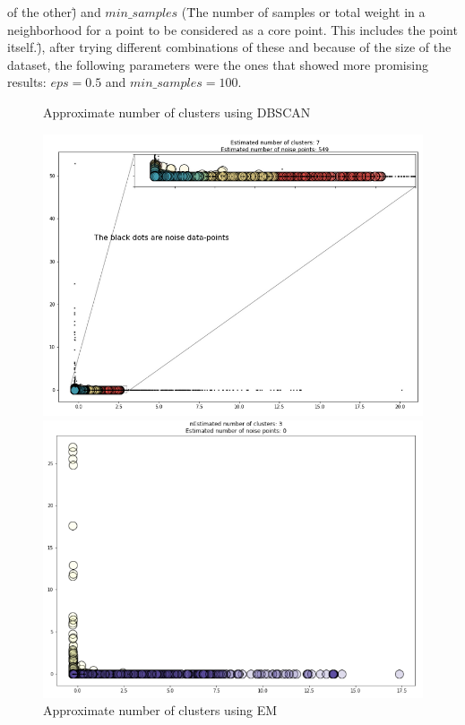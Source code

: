 \documentclass[11pt, fullpage,letterpaper]{article}
\begin{document}
\begin{flushleft}
\begin{enumerate}
        of the other\") and $min\_samples$ (\"The number of samples or total weight in a neighborhood for 
        a point to be considered as a core point. This includes the point itself.\"), after trying 
        different combinations of these and because of the size of the dataset, the following 
        parameters were the ones that showed more promising results: $eps=0.5$ and $min\_samples=100$.
        \begin{figure}
            \begin{minipage}{0.5\textwidth}
                \caption{Approximate number of clusters using DBSCAN}
                \includegraphics[scale=0.30]{ab1}
            \end{minipage}
            \begin{minipage}{0.5\textwidth}
                \caption{Approximate number of clusters using EM}
                \includegraphics[scale=0.35]{ab2}

\end{minipage}
\end{figure}
\end{enumerate}
\end{flushleft}
\end{document}
